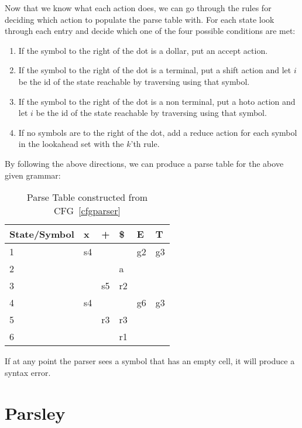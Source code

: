 Now that we know what each action does, we can go through the rules for deciding which action to populate the parse table with. For each state look through each entry and decide which one of the four possible conditions are met:
\begin{enumerate}
  \item If the symbol to the right of the dot is a dollar, put an accept action.
  \item If the symbol to the right of the dot is a terminal, put a shift action and let $i$ be the id of the state reachable by traversing using that symbol.
  \item If the symbol to the right of the dot is a non terminal, put a hoto action and let $i$ be the id of the state reachable by traversing using that symbol.
  \item If no symbols are to the right of the dot, add a reduce action for each symbol in the lookahead set with the $k$'th rule.
\end{enumerate}

By following the above directions, we can produce a parse table for the above given grammar:

\begin{table}[H]
  \centering
  \begin{tabular}{|l|lll|ll|}
  \hline
  State/Symbol & x  & +  & \$ & E  & T  \\ \hline
  1            & s4 &    &    & g2 & g3 \\
  2            &    &    & a  &    &    \\
  3            &    & s5 & r2 &    &    \\
  4            & s4 &    &    & g6 & g3 \\
  5            &    & r3 & r3 &    &    \\
  6            &    &    & r1 &    &    \\ \hline
  \end{tabular}
  \caption*{Parse Table constructed from CFG~\ref{cfgparser}}
\end{table}
If at any point the parser sees a symbol that has an empty cell, it will produce a syntax error.

\section{Parsley}

